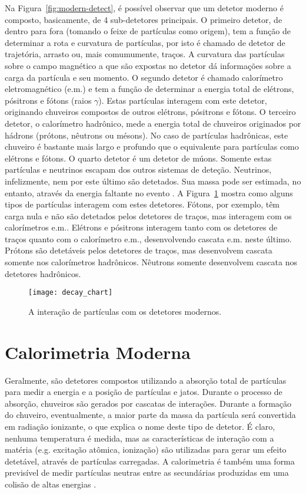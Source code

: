 Na Figura~\ref{fig:modern-detect}, é possível observar que um detetor moderno
é composto, basicamente, de 4 sub-detetores principais. O primeiro detetor, de
dentro para fora (tomando o feixe de partículas como origem), tem a função de
determinar a rota e curvatura de partículas, por isto é chamado de detetor de
trajetória, arrasto ou, mais comumumente, traços. A curvatura das partículas
sobre o campo magnético a que são expostas no detetor dá informações sobre a
carga da partícula e seu momento. O segundo detetor é chamado calorímetro
eletromagnético (e.m.) e tem a função de determinar a energia total de
elétrons, pósitrons e fótons (raios $\gamma$). Estas partículas interagem com
este detetor, originando chuveiros compostos de outros elétrons, pósitrons e
fótons. O terceiro detetor, o calorímetro hadrônico, mede a energia total de
chuveiros originados por hádrons (prótons, nêutrons ou mésons). No caso de
partículas hadrônicas, este chuveiro é bastante mais largo e profundo que o
equivalente para partículas como elétrons e fótons. O quarto detetor é um
detetor de múons. Somente estas partículas e neutrinos escapam dos outros
sistemas de deteção. Neutrinos, infelizmente, nem por este último são
detetados. Sua massa pode ser estimada, no entanto, através da energia
faltante no evento \cite{atlas-tp}. A Figura~\ref{fig:decay} mostra como
alguns tipos de partículas interagem com estes detetores. Fótons, por exemplo,
têm carga nula e não são detetados pelos detetores de traços, mas interagem
com os calorímetros e.m.. Elétrons e pósitrons interagem tanto com os
detetores de traços quanto com o calorímetro e.m., desenvolvendo cascata
e.m. neste último. Prótons são detetáveis pelos detetores de traços, mas
desenvolvem cascata somente nos calorímetros hadrônicos. Nêutrons somente
desenvolvem cascata nos detetores hadrônicos.

\begin{figure}
\begin{center}
\texttt{[image: decay\_chart]}
\end{center}
\caption{A interação de partículas com os detetores modernos.}
\label{fig:decay}
\end{figure}

\section{Calorimetria Moderna}
\label{sec:calorimetria}

Geralmente,  são detetores compostos utilizando a absorção
total de partículas para medir a energia e a posição de partículas e
jatos. Durante o processo de absorção, chuveiros são gerados por cascatas de
interações. Durante a formação do chuveiro, eventualmente, a maior parte da
massa da partícula será convertida em radiação ionizante, o que explica o nome
deste tipo de detetor. É claro, nenhuma temperatura é medida, mas as
características de interação com a matéria (e.g. excitação atômica, ionização)
são utilizadas para gerar um efeito detetável, através de partículas
carregadas. A calorimetria é também uma forma previsível de medir partículas
neutras entre as secundárias produzidas em uma colisão de altas energias
\cite{bock:detector, booth}.

